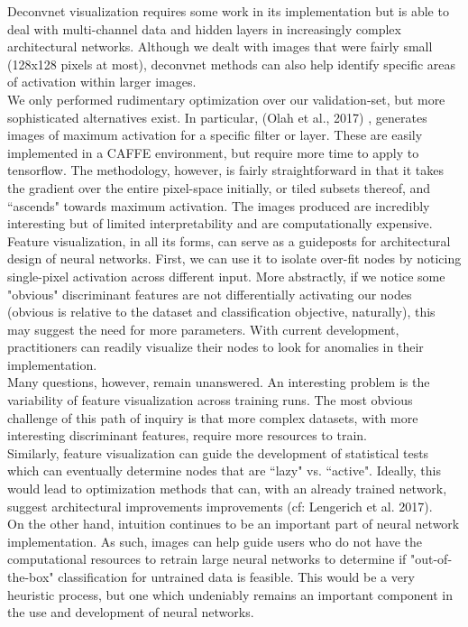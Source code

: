 \documentclass[12pt]{article}
\begin{document}
Deconvnet visualization requires some work in its implementation but is able to deal with multi-channel data and hidden layers in increasingly complex architectural networks. Although we dealt with images that were fairly small (128x128 pixels at most), deconvnet methods can also help identify specific areas of activation within larger images. \\

We only performed rudimentary optimization over our validation-set, but more sophisticated alternatives exist. In particular, (Olah et al., 2017) \cite{distill}, generates images of maximum activation for a specific filter or layer. These are easily implemented in a CAFFE environment, but require more time to apply to tensorflow. The methodology, however, is fairly straightforward in that it takes the gradient over the entire pixel-space initially, or tiled subsets thereof, and ``ascends" towards maximum activation. The images produced are incredibly interesting but of limited interpretability and are computationally expensive. \\

Feature visualization, in all its forms, can serve as a guideposts for architectural design of neural networks. First, we can use it to isolate over-fit nodes by noticing single-pixel activation across different input. More abstractly, if we notice some "obvious" discriminant features are not differentially activating our nodes (obvious is relative to the dataset and classification objective, naturally), this may suggest the need for more parameters. With current development, practitioners can readily visualize their nodes to look for anomalies in their implementation.\\


Many questions, however, remain unanswered. An interesting problem is the variability of feature visualization across training runs. The most obvious challenge of this path of inquiry is that more complex datasets, with more interesting discriminant features, require more resources to train. \\

Similarly, feature visualization can guide the development of statistical tests which can eventually determine nodes that are ``lazy" vs. ``active". Ideally, this would lead to optimization methods that can, with an already trained network, suggest architectural improvements improvements (cf: Lengerich et al. 2017)\cite{resampling}. \\

On the other hand, intuition continues to be an important part of neural network implementation. As such, images can help guide users who do not have the computational resources to retrain large neural networks to determine if "out-of-the-box" classification for untrained data is feasible. This would be a very heuristic process, but one which undeniably remains an important component in the use and development of neural networks. \\

\pagebreak



\end{document}
